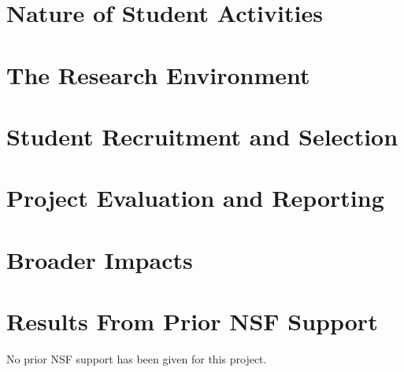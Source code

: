 \section{Nature of Student Activities}

\section{The Research Environment}

\section{Student Recruitment and Selection}

\section{Project Evaluation and Reporting}

\section{Broader Impacts}

\section{Results From Prior NSF Support}

No prior NSF support has been given for this project.
